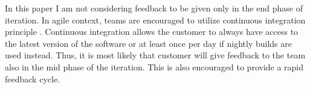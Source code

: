 \documentclass[conference]{IEEEtran}
\begin{document}
In this paper I am not considering feedback to be given only in the end phase of iteration. In agile context, teams are encouraged to utilize continuous integration principle \cite{2002wake}. Continuous integration allows the customer to always have access to the latest version of the software or at least once per day if nightly builds are used instead. Thus, it is most likely that customer will give feedback to the team also in the mid phase of the iteration. This is also encouraged to provide a rapid feedback cycle.

\begin{comment}

\section{Current communication methods for giving and receiving feedback}

The communication methods can be characterized based on the different media capabilities proposed by media richness theory and media synchronicity theory. In addition to these capabilities, the media either synchronous or asynchronous character and they or may not require sharing the same physical location.

In the following chapters various methods for giving and receiving feedback in current agile software projects are investigated.

\textbf{TODO:} Synchronous (face-to-face) vs. asynchonous methods (almost all the other)

\textbf{TODO:} Same physical location vs. different physical location

\subsection{Face-to-face}

Methods for giving feedback vary from document sharing to face-to-face conversation. In agile context tight customer collaboration is emphasised and the preferred communication method is face-to-face conversation. Extreme Programming (XP) even demanded an on-site customer to enable rapid feedback and high-bandwidth communication between customer and the development team \cite{2002wake}. %

In Scrum, on-site customer is not mandatory (LÄHDE). When customer is off-site, the communication methods in the mid iteration falls back to email and phone, as Bhalerao states \cite{2010bhalerao}. The face-to-face feedback is given at the end of the iteration in the iteration demo session.


\end{comment}
\end{document}
